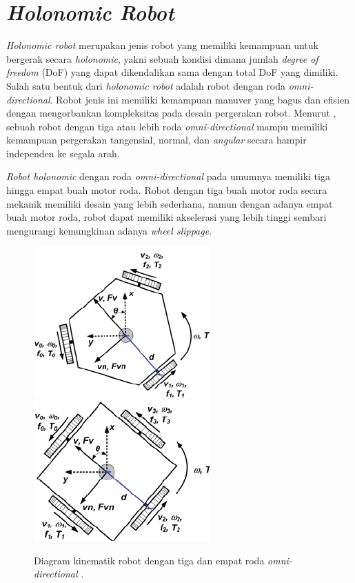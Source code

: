 \section{\emph{Holonomic Robot}}
\label{sec:holonomicrobot}

\emph{Holonomic robot} merupakan jenis robot yang memiliki kemampuan untuk bergerak secara \emph{holonomic},
  yakni sebuah kondisi dimana jumlah \emph{degree of freedom} (DoF) yang dapat dikendalikan sama dengan total DoF yang dimiliki.
Salah satu bentuk dari \emph{holonomic robot} adalah robot dengan roda \emph{omni-directional}.
Robot jenis ini memiliki kemampuan manuver yang bagus dan efisien dengan mengorbankan kompleksitas pada desain pergerakan robot.
Menurut \citet{cit:oliveira2008},
  sebuah robot dengan tiga atau lebih roda \emph{omni-directional} mampu memiliki kemampuan pergerakan tangensial, normal, dan \emph{angular} secara hampir independen ke segala arah.

\emph{Robot holonomic} dengan roda \emph{omni-directional} pada umumnya memiliki tiga hingga empat buah motor roda.
Robot dengan tiga buah motor roda secara mekanik memiliki desain yang lebih sederhana,
  namun dengan adanya empat buah motor roda,
  robot dapat memiliki akselerasi yang lebih tinggi sembari mengurangi kemungkinan adanya \emph{wheel slippage}.

\begin{figure}[ht]
  \centering
  \includegraphics[height=0.3\textwidth,keepaspectratio]{gambar/diagram-robot-tiga-roda.png}
  \includegraphics[height=0.3\textwidth,keepaspectratio]{gambar/diagram-robot-empat-roda.png}
  \caption{Diagram kinematik robot dengan tiga dan empat roda \emph{omni-directional} \citep{cit:oliveira2008}.}
  \label{fig:diagramkinematikrobot}
\end{figure}

